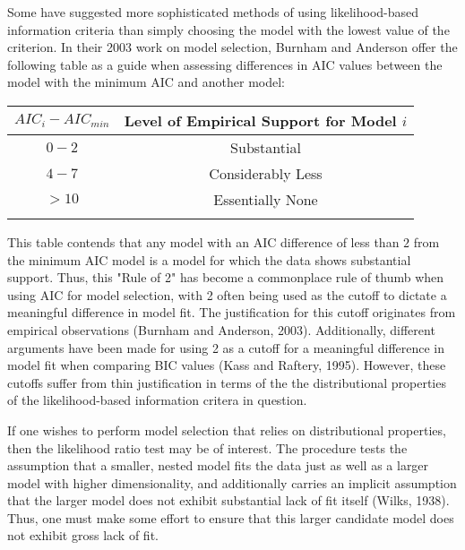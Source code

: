 		Some have suggested more sophisticated methods of using likelihood-based information criteria than simply choosing the model with the lowest value of the criterion. In their 2003 work on 
		model selection, Burnham and Anderson offer the following table as a guide when assessing differences in AIC values between the model with the minimum AIC and another model:
		\pagebreak

		\begin{table}[h]
		\centering
		{
		\begin{tabular}{ c|c}
		$AIC_{i}-AIC_{min}$ & Level of Empirical Support for Model $i$\\
		 \hline
		 $0 - 2$ & Substantial\\
		 $4 - 7$ & Considerably Less\\
		 $> 10$ & Essentially None\\
		 \Xhline{3\arrayrulewidth}
		\end{tabular}
		}
		\end{table}	
		
		This table contends that any model with an AIC difference of less than $2$ from the minimum AIC model is a model for which the data shows substantial support. Thus, this "Rule of 2" has become a
		commonplace rule of thumb when using AIC for model selection, with 2 often being used as the cutoff to dictate a meaningful difference in model fit. The justification for this cutoff originates
		from empirical observations (Burnham and Anderson, 2003). Additionally, different  arguments have been made for using 2 as a cutoff for a meaningful difference in model fit
		when comparing BIC values (Kass and Raftery, 1995). However, these cutoffs suffer from thin justification in terms of the the distributional properties of the likelihood-based information
		critera in question.

		If one wishes to perform model selection that relies on distributional properties, then the likelihood ratio test may be of interest. The procedure tests the assumption that
		a smaller, nested model fits the data just as well as a larger model with higher dimensionality, and additionally carries an implicit assumption that the larger model does
		not exhibit substantial lack of fit itself (Wilks, 1938). Thus, one must make some effort to ensure that this larger candidate model does not exhibit gross lack of fit.

